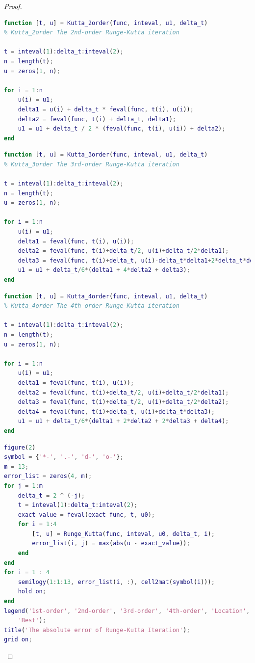 \documentclass{article}
\begin{document}
\begin{proof}
\begin{lstlisting}[language = {MATLAB}]
function [t, u] = Kutta_2order(func, inteval, u1, delta_t)
% Kutta_2order The 2nd-order Runge-Kutta iteration

t = inteval(1):delta_t:inteval(2);
n = length(t);
u = zeros(1, n);

for i = 1:n
    u(i) = u1;
    delta1 = u(i) + delta_t * feval(func, t(i), u(i));
    delta2 = feval(func, t(i) + delta_t, delta1);
    u1 = u1 + delta_t / 2 * (feval(func, t(i), u(i)) + delta2);
end
\end{lstlisting}

\begin{lstlisting}[language = {MATLAB}]
function [t, u] = Kutta_3order(func, inteval, u1, delta_t)
% Kutta_3order The 3rd-order Runge-Kutta iteration

t = inteval(1):delta_t:inteval(2);
n = length(t);
u = zeros(1, n);

for i = 1:n
    u(i) = u1;
    delta1 = feval(func, t(i), u(i));
    delta2 = feval(func, t(i)+delta_t/2, u(i)+delta_t/2*delta1);
    delta3 = feval(func, t(i)+delta_t, u(i)-delta_t*delta1+2*delta_t*delta2);
    u1 = u1 + delta_t/6*(delta1 + 4*delta2 + delta3);
end
\end{lstlisting}

\begin{lstlisting}[language = {MATLAB}]
function [t, u] = Kutta_4order(func, inteval, u1, delta_t)
% Kutta_4order The 4th-order Runge-Kutta iteration

t = inteval(1):delta_t:inteval(2);
n = length(t);
u = zeros(1, n);

for i = 1:n
    u(i) = u1;
    delta1 = feval(func, t(i), u(i));
    delta2 = feval(func, t(i)+delta_t/2, u(i)+delta_t/2*delta1);
    delta3 = feval(func, t(i)+delta_t/2, u(i)+delta_t/2*delta2);
    delta4 = feval(func, t(i)+delta_t, u(i)+delta_t*delta3);
    u1 = u1 + delta_t/6*(delta1 + 2*delta2 + 2*delta3 + delta4);
end
\end{lstlisting}

\begin{lstlisting}[language = {MATLAB}]
% Page 79, Exercise 3
figure(2)
symbol = {'*-', '.-', 'd-', 'o-'};
m = 13;
error_list = zeros(4, m);
for j = 1:m
    delta_t = 2 ^ (-j);
    t = inteval(1):delta_t:inteval(2);
    exact_value = feval(exact_func, t, u0);
    for i = 1:4
        [t, u] = Runge_Kutta(func, inteval, u0, delta_t, i);
        error_list(i, j) = max(abs(u - exact_value));
    end
end
for i = 1 : 4
    semilogy(1:1:13, error_list(i, :), cell2mat(symbol(i)));
    hold on;
end
legend('1st-order', '2nd-order', '3rd-order', '4th-order', 'Location',...
    'Best');
title('The absolute error of Runge-Kutta Iteration');
grid on;
\end{lstlisting}


\end{proof}
\end{document}

